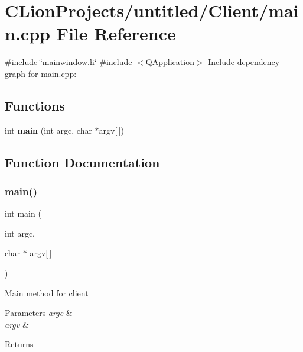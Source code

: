 \section{C\+Lion\+Projects/untitled/\+Client/main.cpp File Reference}
\label{main_8cpp}
{\ttfamily \#include \char`\"{}mainwindow.\+h\char`\"{}}\newline
{\ttfamily \#include $<$Q\+Application$>$}\newline
Include dependency graph for main.\+cpp\+:
\subsection*{Functions}
\begin{DoxyCompactItemize}
\item 
int \textbf{ main} (int argc, char $\ast$argv[$\,$])
\end{DoxyCompactItemize}


\subsection{Function Documentation}
\mbox{\label{main_8cpp_a0ddf1224851353fc92bfbff6f499fa97}} 
\subsubsection{main()}
{\footnotesize\ttfamily int main (\begin{DoxyParamCaption}\item[{int}]{argc,  }\item[{char $\ast$}]{argv[$\,$] }\end{DoxyParamCaption})}

Main method for client 
\begin{DoxyParams}{Parameters}
{\em argc} & \\
\hline
{\em argv} & \\
\hline
\end{DoxyParams}
\begin{DoxyReturn}{Returns}

\end{DoxyReturn}
